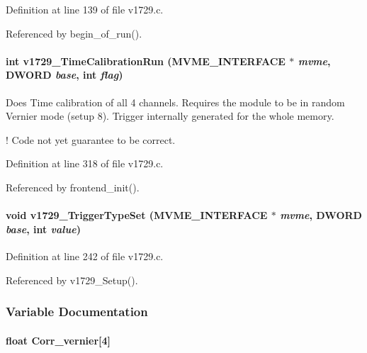 Definition at line 139 of file v1729.c.

Referenced by begin\_\-of\_\-run().
\paragraph[{v1729\_\-TimeCalibrationRun}]{\setlength{\rightskip}{0pt plus 5cm}int v1729\_\-TimeCalibrationRun ({\bf MVME\_\-INTERFACE} $\ast$ {\em mvme}, \/  {\bf DWORD} {\em base}, \/  int {\em flag})}\hfill\label{v1729_8c_a6a5b223f30c983b7f4dcac408d3f8b9f}
Does Time calibration of all 4 channels. Requires the module to be in random Vernier mode (setup 8). Trigger internally generated for the whole memory.

! Code not yet guarantee to be correct. 

Definition at line 318 of file v1729.c.

Referenced by frontend\_\-init().
\paragraph[{v1729\_\-TriggerTypeSet}]{\setlength{\rightskip}{0pt plus 5cm}void v1729\_\-TriggerTypeSet ({\bf MVME\_\-INTERFACE} $\ast$ {\em mvme}, \/  {\bf DWORD} {\em base}, \/  int {\em value})}\hfill\label{v1729_8c_a12b51ae0d0a7824c97d04269629cdf5c}


Definition at line 242 of file v1729.c.

Referenced by v1729\_\-Setup().

\subsubsection{Variable Documentation}
\paragraph[{Corr\_\-vernier}]{\setlength{\rightskip}{0pt plus 5cm}float {\bf Corr\_\-vernier}\mbox{[}4\mbox{]}}\hfill\label{v1729_8c_a4f11c5c77dc7f296edafb8e23c822d2a}


